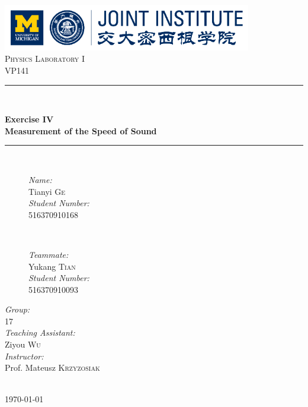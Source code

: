 \begin{titlepage}

\newcommand{\HRule}{\rule{\linewidth}{0.5mm}}

\center

\includegraphics[height=0.8in]{images/logo.png}\\[1cm]

\textsc{\Large Physics Laboratory I}\\[0.4cm]
\textsc{\large VP141}\\[0.4cm]

\HRule \\[0.4cm]
{
    \bfseries
    {\huge Exercise IV}\\[0.3cm]
    {\large Measurement of the Speed of Sound}\\[0.2cm]
    \HRule \\[1.5cm]
}
\begin{figure}[h]
    \hspace{3cm}
    \begin{minipage}{0.4\textwidth}
        \large
        \emph{Name:}\\
        Tianyi \textsc{Ge} \\

        \emph{Student Number:}\\
        516370910168
    \end{minipage}
    ~
    \begin{minipage}{0.4\textwidth}
        \large
        \emph{Teammate:}\\
        Yukang \textsc{Tian} \\

        \emph{Student Number:}\\
        516370910093
    \end{minipage}
\end{figure}

\vspace{1cm}

\begin{minipage}{0.4\textwidth}
    \large
    \emph{Group:}\\
    17\\

    \emph{Teaching Assistant:}\\
    Ziyou \textsc{Wu}\\

    \emph{Instructor:}\\
    Prof. Mateusz \textsc{Krzyzosiak}
\end{minipage}\\[2cm]

{\large \today}\\[2cm]

\vfill

\end{titlepage}

\tableofcontents
\clearpage